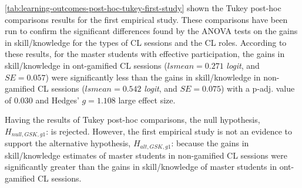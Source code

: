\autoref{tab:learning-outcomes-post-hoc-tukey-first-study} shown the Tukey post-hoc comparisons results for the first empirical study. These comparisons have been run to confirm the significant differences found by the ANOVA tests on the gains in skill/knowledge for the types of CL sessions and the CL roles. According to these results, for the master students with effective participation, the gains in skill/knowledge in ont-gamified CL sessions ($lsmean = 0.271$ \emph{logit}, and $SE = 0.057$) were significantly less than the gains in skill/knowledge in non-gamified CL sessions ($lsmean = 0.542$ \emph{logit}, and $SE = 0.075$) with a p-adj. value of $0.030$ and Hedges' $g = 1.108$ large effect size.

Having the results of Tukey post-hoc comparisons, the null hypothesis, $H_{null,GSK,g1}$:  is rejected. However, the first empirical study is not an evidence to support 
the alternative hypothesis, $H_{alt,GSK,g1}$: 
because the gains in skill/knowledge estimates of master students in non-gamified CL sessions were significantly greater than the gains in skill/knowledge of master students in ont-gamified CL sessions.

